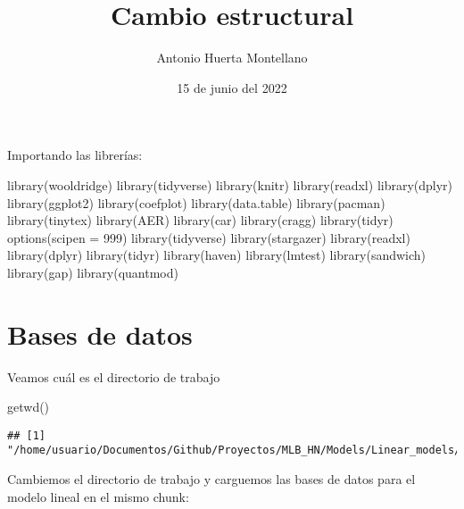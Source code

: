\documentclass[
]{article}
\title{Cambio estructural}
\author{Antonio Huerta Montellano}
\date{15 de junio del 2022}
\newenvironment{Shaded}{\begin{snugshade}}{\end{snugshade}}
\newcommand{\AttributeTok}[1]{\textcolor[rgb]{0.77,0.63,0.00}{#1}}
\newcommand{\DecValTok}[1]{\textcolor[rgb]{0.00,0.00,0.81}{#1}}
\newcommand{\FunctionTok}[1]{\textcolor[rgb]{0.00,0.00,0.00}{#1}}
\newcommand{\NormalTok}[1]{#1}
\begin{document}
\maketitle

Importando las librerías:

\begin{Shaded}
\begin{Highlighting}[]
\FunctionTok{library}\NormalTok{(wooldridge)}
\FunctionTok{library}\NormalTok{(tidyverse)}
\FunctionTok{library}\NormalTok{(knitr)}
\FunctionTok{library}\NormalTok{(readxl)}
\FunctionTok{library}\NormalTok{(dplyr)}
\FunctionTok{library}\NormalTok{(ggplot2)}
\FunctionTok{library}\NormalTok{(coefplot)}
\FunctionTok{library}\NormalTok{(data.table)}
\FunctionTok{library}\NormalTok{(pacman)}
\FunctionTok{library}\NormalTok{(tinytex)}
\FunctionTok{library}\NormalTok{(AER)}
\FunctionTok{library}\NormalTok{(car)}
\FunctionTok{library}\NormalTok{(cragg)}
\FunctionTok{library}\NormalTok{(tidyr)}
\FunctionTok{options}\NormalTok{(}\AttributeTok{scipen =} \DecValTok{999}\NormalTok{)}
\FunctionTok{library}\NormalTok{(tidyverse)}
\FunctionTok{library}\NormalTok{(stargazer)}
\FunctionTok{library}\NormalTok{(readxl)}
\FunctionTok{library}\NormalTok{(dplyr)}
\FunctionTok{library}\NormalTok{(tidyr)}
\FunctionTok{library}\NormalTok{(haven)}
\FunctionTok{library}\NormalTok{(lmtest)}
\FunctionTok{library}\NormalTok{(sandwich)}
\FunctionTok{library}\NormalTok{(gap)}
\FunctionTok{library}\NormalTok{(quantmod)}
\end{Highlighting}
\end{Shaded}

\section{Bases de datos}

Veamos cuál es el directorio de trabajo

\begin{Shaded}
\begin{Highlighting}[]
\FunctionTok{getwd}\NormalTok{()}
\end{Highlighting}
\end{Shaded}

\begin{verbatim}
## [1] "/home/usuario/Documentos/Github/Proyectos/MLB_HN/Models/Linear_models/Free_agent/Test"
\end{verbatim}

Cambiemos el directorio de trabajo y carguemos las bases de datos para
el modelo lineal en el mismo chunk:
\end{document}
